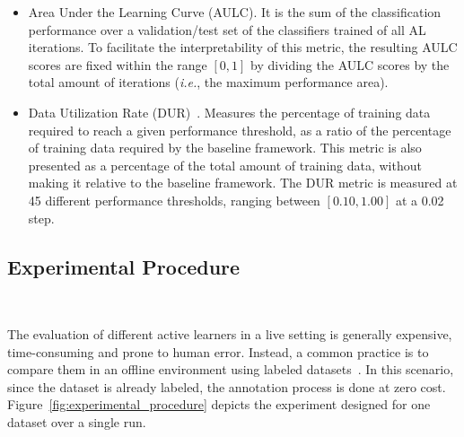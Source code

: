 \documentclass[preprint, 12pt]{elsarticle}
\begin{document}
\begin{itemize}

    \item Area Under the Learning Curve (AULC). It is the sum of the
        classification performance over a validation/test set of the
        classifiers trained of all AL iterations. To facilitate the
        interpretability of this metric, the resulting AULC scores are fixed
        within the range $[0, 1]$ by dividing the AULC scores by the total
        amount of iterations (\textit{i.e.}, the maximum performance area).

    \item Data Utilization Rate (DUR)~\cite{Reitmaier2013}. Measures the
        percentage of training data required to reach a given performance
        threshold, as a ratio of the percentage of training data required by
        the baseline framework. This metric is also presented as a percentage
        of the total amount of training data, without making it relative to
        the baseline framework. The DUR metric is measured at 45 different
        performance thresholds, ranging between $[0.10, 1.00]$ at a 0.02 step.

\end{itemize}
 
\subsection{Experimental Procedure}~\label{sec:experimental_procedure}

The evaluation of different active learners in a live setting is generally
expensive, time-consuming and prone to human error. Instead, a common practice
is to compare them in an offline environment using labeled
datasets~\cite{Kagy2019}. In this scenario, since the dataset is already
labeled, the annotation process is done at zero cost.
Figure~\ref{fig:experimental_procedure} depicts the experiment designed for
one dataset over a single run. 
 
\end{document}
